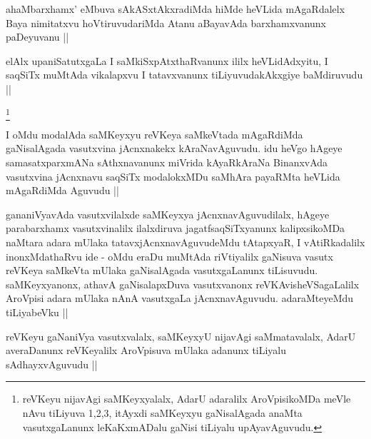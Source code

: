 \begin{artha}
ahaMbarxhamx' eMbuva sAkASxtAkxradiMda hiMde heVLida mAgaRdalelx Baya nimitatxvu hoVtiruvudariMda Atanu aBayavAda barxhamxvanunx paDeyuvanu ||
\end{artha}


\begin{artha}
elAlx upaniSatutxgaLa I saMkiSxpAtxthaRvanunx ililx heVLidAdxyitu, I saqSiTx muMtAda vikalapxvu I tatavxvanunx tiLiyuvudakAkxgiye baMdiruvudu ||
\end{artha}


\begin{artha}
\footnote{reVKeyu nijavAgi saMKeyxyalalx, AdarU adaralilx AroVpisikoMDa meVle nAvu tiLiyuva 1,2,3, itAyxdi saMKeyxyu gaNisalAgada anaMta vasutxgaLanunx leKaKxmADalu gaNisi tiLiyalu upAyavAguvudu.}
\end{artha}

\begin{artha}
I oMdu modalAda saMKeyxyu reVKeya saMkeVtada mAgaRdiMda gaNisalAgada vasutxvina jAcnxnakekx kAraNavAguvudu. idu heVgo hAgeye samasatxparxmANa sAthxnavanunx miVrida kAyaRkAraNa BinanxvAda vasutxvina jAcnxnavu saqSiTx modalokxMDu saMhAra payaRMta heVLida mAgaRdiMda Aguvudu ||
\end{artha}


\begin{artha}
gananiVyavAda vasutxvilalxde saMKeyxya jAcnxnavAguvudilalx, hAgeye parabarxhamx vasutxvinalilx ilalxdiruva jagatfsaqSiTxyanunx kalipxsikoMDa naMtara adara mUlaka tatavxjAcnxnavAguvudeMdu tAtapxyaR, I vAtiRkadalilx inonxMdathaRvu ide - oMdu eraDu muMtAda riVtiyalilx gaNisuva vasutx reVKeya saMkeVta mUlaka gaNisalAgada vasutxgaLanunx tiLisuvudu. saMKeyxyanonx, athavA gaNisalapxDuva vasutxvanonx reVKAvisheVSagaLalilx AroVpisi adara mUlaka nAnA vasutxgaLa jAcnxnavAguvudu. adaraMteyeMdu tiLiyabeVku ||
\end{artha}


\begin{artha}
reVKeyu gaNaniVya vasutxvalalx, saMKeyxyU nijavAgi saMmatavalalx, AdarU averaDanunx reVKeyalilx AroVpisuva mUlaka adanunx tiLiyalu sAdhayxvAguvudu ||
\end{artha}

